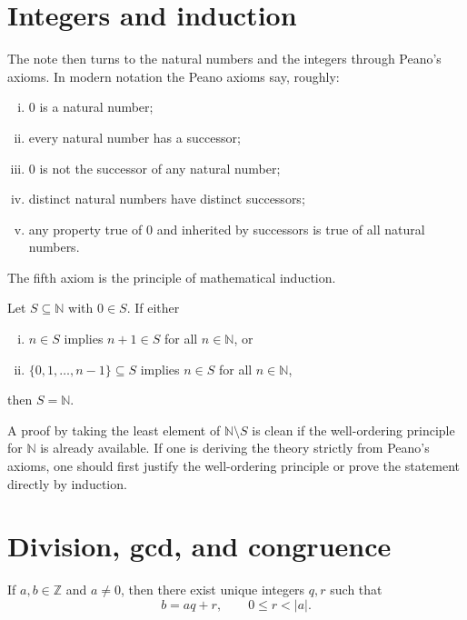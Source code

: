 \section{Integers and induction}

The note then turns to the natural numbers and the integers through Peano's axioms.  In modern notation the Peano axioms say, roughly:
\begin{enumerate}[(i)]
  \item \(0\) is a natural number;
  \item every natural number has a successor;
  \item \(0\) is not the successor of any natural number;
  \item distinct natural numbers have distinct successors;
  \item any property true of \(0\) and inherited by successors is true of all natural numbers.
\end{enumerate}
The fifth axiom is the principle of mathematical induction.

\begin{theorem}
Let \(S\subseteq \mathbb N\) with \(0\in S\).  If either
\begin{enumerate}[(i)]
  \item \(n\in S\) implies \(n+1\in S\) for all \(n\in\mathbb N\), or
  \item \(\{0,1,\dots,n-1\}\subseteq S\) implies \(n\in S\) for all \(n\in\mathbb N\),
\end{enumerate}
then \(S=\mathbb N\).
\end{theorem}

\begin{caution}
A proof by taking the least element of \(\mathbb N\setminus S\) is clean if the well-ordering principle for \(\mathbb N\) is already available.  If one is deriving the theory strictly from Peano's axioms, one should first justify the well-ordering principle or prove the statement directly by induction.
\end{caution}

\section{Division, gcd, and congruence}

\begin{theorem}
If \(a,b\in\mathbb Z\) and \(a\neq0\), then there exist unique integers \(q,r\) such that
\[
  b=aq+r,
  \qquad
  0\le r<|a|.
\]
\end{theorem}

